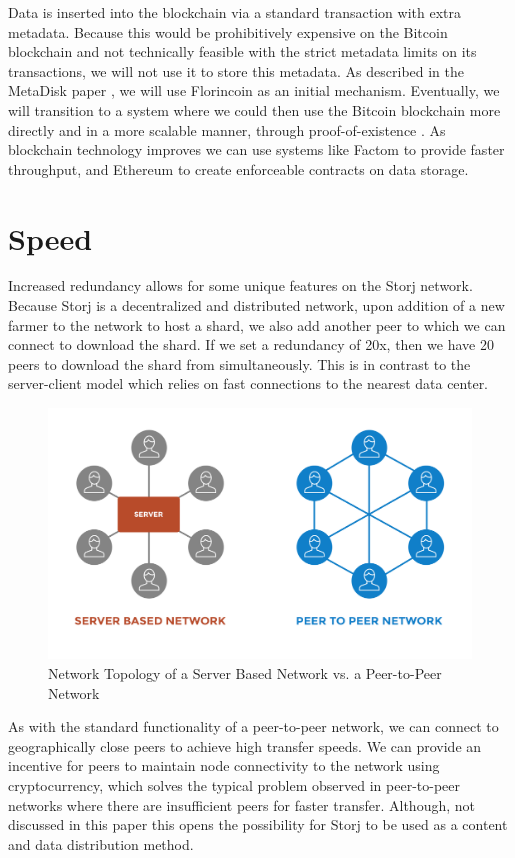 \documentclass[a4paper,10pt]{article}
\begin{document}
Data is inserted into the blockchain via a standard transaction with extra metadata. Because this would be prohibitively expensive on the Bitcoin blockchain and not technically feasible with the strict metadata limits on its transactions, we will not use it to store this metadata. As described in the MetaDisk paper \cite{1}, we will use Florincoin \cite{6} as an initial mechanism. Eventually, we will transition to a system where we could then use the Bitcoin blockchain more directly and in a more scalable manner, through proof-of-existence \cite{4} \cite{5} \cite{7}. As blockchain technology improves we can use systems like Factom \cite{7} to provide faster throughput, and Ethereum \cite{22} to create enforceable contracts on data storage.

\section{Speed}
Increased redundancy allows for some unique features on the Storj network. Because Storj is a decentralized and distributed network, upon addition of a new farmer to the network to host a shard, we also add another peer to which we can connect to download the shard. If we set a redundancy of 20x, then we have 20 peers to download the shard from simultaneously. This is in contrast to the server-client model which relies on fast connections to the nearest data center.\\

\begin{figure}[hbt]
\centering
\includegraphics[width=\linewidth]{7}
\caption{Network Topology of a Server Based Network vs. a Peer-to-Peer Network}
\end{figure}

As with the standard functionality of a peer-to-peer network, we can connect to geographically close peers to achieve high transfer speeds. We can provide an incentive for peers to maintain node connectivity to the network using cryptocurrency, which solves the typical problem observed in peer-to-peer networks where there are insufficient peers for faster transfer. Although, not discussed in this paper this opens the possibility for Storj to be used as a content and data distribution method. 
\end{document}

